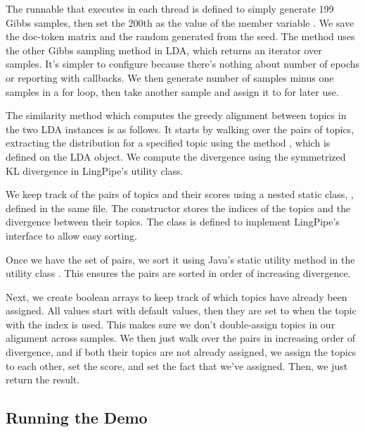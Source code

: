 The runnable that executes in each thread is defined to simply
generate 199 Gibbs samples, then set the 200th as the value of
the member variable .
%
%
We save the doc-token matrix and the random generated from the seed.
The  method uses the other Gibbs sampling method in LDA,
which returns an iterator over samples.  It's simpler to configure
because there's nothing about number of epochs or reporting with callbacks.
We then generate number of samples minus one samples in a for loop,
then take another sample and assign it to  for later use.

The similarity method which computes the greedy alignment between
topics in the two LDA instances is as follows.
%
%
It starts by walking over the pairs of topics, extracting the
distribution for a specified topic using the method
, which is defined on the LDA object.
We compute the divergence using the symmetrized KL divergence in
LingPipe's  utility class.  

We keep track of the pairs of topics and their scores using
a nested static class, , defined in the same file.
%
%
The constructor stores the indices of the topics and the divergence
between their topics.  The class is defined to implement LingPipe's
 interface to allow easy sorting.  

Once we have the set of pairs, we sort it using Java's static
 utility method in the utility class .
This ensures the pairs are sorted in order of increasing divergence.

Next, we create boolean arrays to keep track of which topics have
already been assigned.  All values start with default 
values, then they are set to  when the topic with the index
is used.  This makes sure we don't double-assign topics in our
alignment across samples.  We then just walk over the pairs in
increasing order of divergence, and if both their topics are not
already assigned, we assign the topics to each other, set the score,
and set the fact that we've assigned.  Then, we just return the result.

\subsection{Running the Demo}

